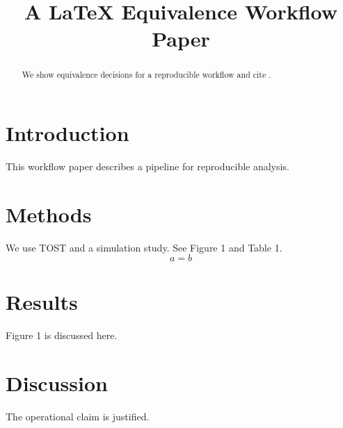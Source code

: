 \title{A LaTeX Equivalence Workflow Paper}

\begin{abstract}
We show equivalence decisions for a reproducible workflow and cite \citep{schuirmann1987}.
\end{abstract}

\section{Introduction}
This workflow paper describes a pipeline for reproducible analysis.

\section{Methods}
We use TOST and a simulation study. See Figure 1 and Table 1.
\begin{equation}
a=b
\end{equation}

\section{Results}
Figure 1 is discussed here.

\section{Discussion}
The operational claim is justified.


